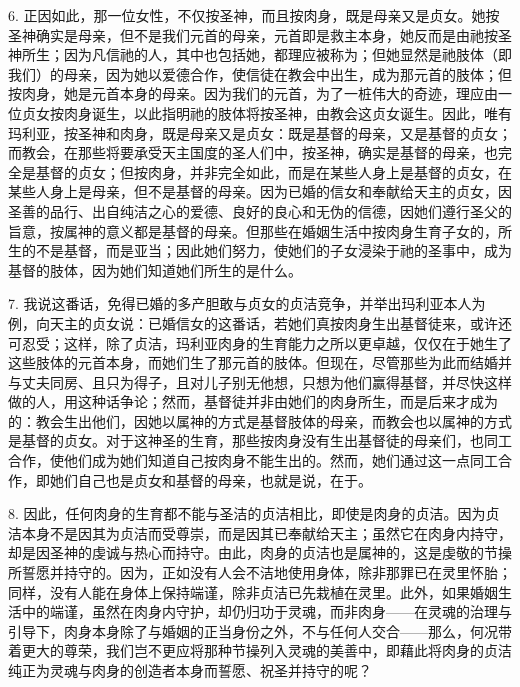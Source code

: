 6. 正因如此，那一位女性，不仅按圣神，而且按肉身，既是母亲又是贞女。她按圣神确实是母亲，但不是我们元首的母亲，元首即是救主本身，她反而是由祂按圣神所生；因为凡信祂的人，其中也包括她，都理应被称为；但她显然是祂肢体（即我们）的母亲，因为她以爱德合作，使信徒在教会中出生，成为那元首的肢体；但按肉身，她是元首本身的母亲。因为我们的元首，为了一桩伟大的奇迹，理应由一位贞女按肉身诞生，以此指明祂的肢体将按圣神，由教会这贞女诞生。因此，唯有玛利亚，按圣神和肉身，既是母亲又是贞女：既是基督的母亲，又是基督的贞女；而教会，在那些将要承受天主国度的圣人们中，按圣神，确实是基督的母亲，也完全是基督的贞女；但按肉身，并非完全如此，而是在某些人身上是基督的贞女，在某些人身上是母亲，但不是基督的母亲。因为已婚的信女和奉献给天主的贞女，因圣善的品行、出自纯洁之心的爱德、良好的良心和无伪的信德，因她们遵行圣父的旨意，按属神的意义都是基督的母亲。但那些在婚姻生活中按肉身生育子女的，所生的不是基督，而是亚当；因此她们努力，使她们的子女浸染于祂的圣事中，成为基督的肢体，因为她们知道她们所生的是什么。\par

7. 我说这番话，免得已婚的多产胆敢与贞女的贞洁竞争，并举出玛利亚本人为例，向天主的贞女说：已婚信女的这番话，若她们真按肉身生出基督徒来，或许还可忍受；这样，除了贞洁，玛利亚肉身的生育能力之所以更卓越，仅仅在于她生了这些肢体的元首本身，而她们生了那元首的肢体。但现在，尽管那些为此而结婚并与丈夫同房、且只为得子，且对儿子别无他想，只想为他们赢得基督，并尽快这样做的人，用这种话争论；然而，基督徒并非由她们的肉身所生，而是后来才成为的：教会生出他们，因她以属神的方式是基督肢体的母亲，而教会也以属神的方式是基督的贞女。对于这神圣的生育，那些按肉身没有生出基督徒的母亲们，也同工合作，使他们成为她们知道自己按肉身不能生出的。然而，她们通过这一点同工合作，即她们自己也是贞女和基督的母亲，也就是说，在于。\par

8. 因此，任何肉身的生育都不能与圣洁的贞洁相比，即使是肉身的贞洁。因为贞洁本身不是因其为贞洁而受尊崇，而是因其已奉献给天主；虽然它在肉身内持守，却是因圣神的虔诚与热心而持守。由此，肉身的贞洁也是属神的，这是虔敬的节操所誓愿并持守的。因为，正如没有人会不洁地使用身体，除非那罪已在灵里怀胎；同样，没有人能在身体上保持端谨，除非贞洁已先栽植在灵里。此外，如果婚姻生活中的端谨，虽然在肉身内守护，却仍归功于灵魂，而非肉身——在灵魂的治理与引导下，肉身本身除了与婚姻的正当身份之外，不与任何人交合——那么，何况带着更大的尊荣，我们岂不更应将那种节操列入灵魂的美善中，即藉此将肉身的贞洁纯正为灵魂与肉身的创造者本身而誓愿、祝圣并持守的呢？\par


